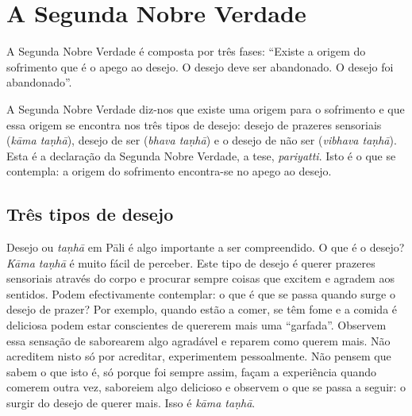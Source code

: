 
\chapter{A Segunda Nobre Verdade}

A Segunda Nobre Verdade é composta por três fases: “Existe a origem do
sofrimento que é o apego ao desejo. O desejo deve ser abandonado. O desejo foi
abandonado”.

A Segunda Nobre Verdade diz-nos que existe uma origem para o sofrimento e que
essa origem se encontra nos três tipos de desejo: desejo de prazeres sensoriais
(\emph{kāma taṇhā}), desejo de ser (\emph{bhava taṇhā}) e o desejo de não ser
(\emph{vibhava taṇhā}). Esta é a declaração da Segunda Nobre Verdade, a tese,
\emph{pariyatti}. Isto é o que se contempla: a origem do sofrimento encontra-se
no apego ao desejo.

\section{Três tipos de desejo}

Desejo ou \emph{taṇhā} em Pāli é algo importante a ser compreendido. O que é o
desejo? \emph{Kāma taṇhā} é muito fácil de perceber. Este tipo de desejo é
querer prazeres sensoriais através do corpo e procurar sempre coisas que excitem
e agradem aos sentidos. Podem efectivamente contemplar: o que é que se passa
quando surge o desejo de prazer? Por exemplo, quando estão a comer, se têm fome
e a comida é deliciosa podem estar conscientes de quererem mais uma “garfada”.
Observem essa sensação de saborearem algo agradável e reparem como querem mais.
Não acreditem nisto só por acreditar, experimentem pessoalmente. Não pensem que
sabem o que isto é, só porque foi sempre assim, façam a experiência quando
comerem outra vez, saboreiem algo delicioso e observem o que se passa a seguir:
o surgir do desejo de querer mais. Isso é \emph{kāma taṇhā}.

